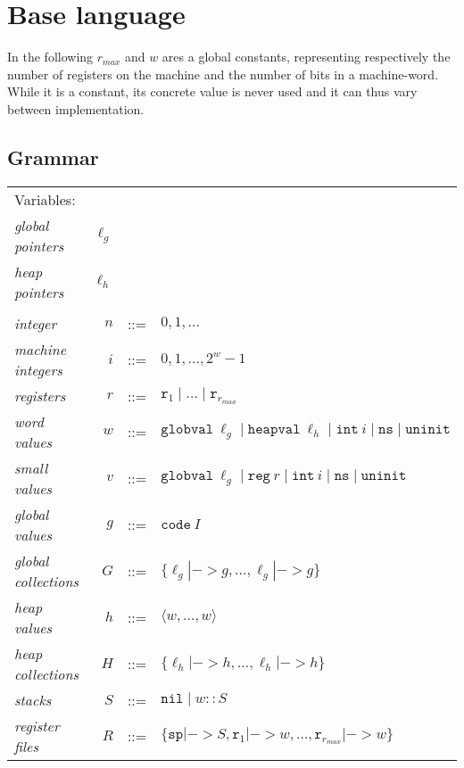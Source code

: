 \section{Base language}

In the following $r_{max}$ and $w$ ares a global constants, representing
respectively the number of registers on the machine and the number of bits in a
machine-word. While it is a constant, its concrete value is never used and it
can thus vary between implementation.
\\

\subsection{Grammar}

\begin{tabular}{lrcl}
Variables: \\
\textit{global pointers}    & $\ell_g$ \\
\textit{heap pointers}      & $\ell_h$ \\
\\
\textit{integer}            & $n$ & ::= & $0, 1, \dots$ \\
\textit{machine integers}   & $i$ & ::= & $0, 1, \dots, 2^{w}-1$ \\
\textit{registers}          & $r$ & ::= & $\mathtt{r}_1 \mid \dots \mid \mathtt{r}_{r_{max}}$ \\
\textit{word values}        & $w$ & ::= & $\mathtt{globval}\ \ell_g \mid \mathtt{heapval}\ \ell_h \mid \mathtt{int}\ i \mid \mathtt{ns} \mid \mathtt{uninit}$ \\
\textit{small values}       & $v$ & ::= & $\mathtt{globval}\ \ell_g \mid \mathtt{reg}\ r \mid \mathtt{int}\ i \mid \mathtt{ns} \mid \mathtt{uninit}$ \\
\textit{global values}      & $g$ & ::= & $\mathtt{code}\ I$ \\
\textit{global collections} & $G$ & ::= & $\{\ell_g |-> g, \dots, \ell_g |-> g\}$ \\
\textit{heap values}        & $h$ & ::= & $\langle w, \dots, w \rangle$ \\
\textit{heap collections}   & $H$ & ::= & $\{\ell_h |-> h, \dots, \ell_h |-> h\}$ \\
\textit{stacks}             & $S$ & ::= & $\mathtt{nil} \mid w :: S$ \\
\textit{register files}     & $R$ & ::= & $\{\mathtt{sp} |-> S, \mathtt{r}_1 |-> w, \dots, \mathtt{r}_{r_{max}} |-> w\}$ \\

\end{tabular}
